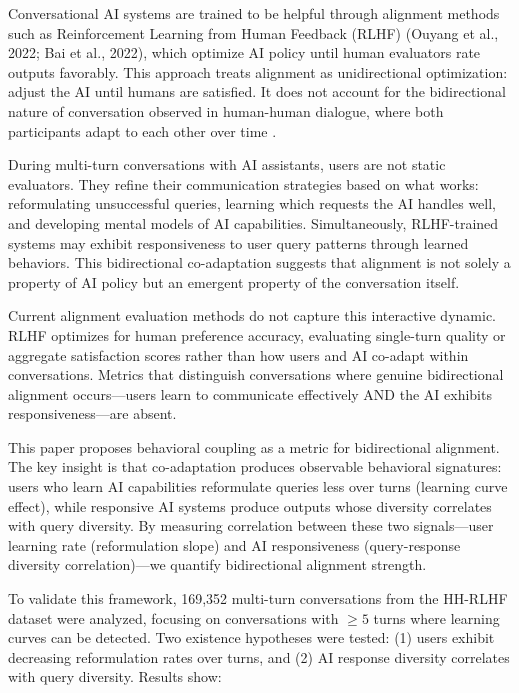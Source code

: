 
Conversational AI systems are trained to be helpful through alignment methods such as Reinforcement Learning from Human Feedback (RLHF) (Ouyang et al., 2022; Bai et al., 2022), which optimize AI policy until human evaluators rate outputs favorably. This approach treats alignment as unidirectional optimization: adjust the AI until humans are satisfied. It does not account for the bidirectional nature of conversation observed in human-human dialogue, where both participants adapt to each other over time \citep{pickering2004toward}.

During multi-turn conversations with AI assistants, users are not static evaluators. They refine their communication strategies based on what works: reformulating unsuccessful queries, learning which requests the AI handles well, and developing mental models of AI capabilities. Simultaneously, RLHF-trained systems may exhibit responsiveness to user query patterns through learned behaviors. This bidirectional co-adaptation suggests that alignment is not solely a property of AI policy but an emergent property of the conversation itself.

Current alignment evaluation methods do not capture this interactive dynamic. RLHF optimizes for human preference accuracy, evaluating single-turn quality or aggregate satisfaction scores rather than how users and AI co-adapt within conversations. Metrics that distinguish conversations where genuine bidirectional alignment occurs---users learn to communicate effectively AND the AI exhibits responsiveness---are absent.

This paper proposes behavioral coupling as a metric for bidirectional alignment. The key insight is that co-adaptation produces observable behavioral signatures: users who learn AI capabilities reformulate queries less over turns (learning curve effect), while responsive AI systems produce outputs whose diversity correlates with query diversity. By measuring correlation between these two signals---user learning rate (reformulation slope) and AI responsiveness (query-response diversity correlation)---we quantify bidirectional alignment strength.

To validate this framework, 169,352 multi-turn conversations from the HH-RLHF dataset \citep{bai2022constitutional} were analyzed, focusing on conversations with $\geq 5$ turns where learning curves can be detected. Two existence hypotheses were tested: (1) users exhibit decreasing reformulation rates over turns, and (2) AI response diversity correlates with query diversity. Results show:

